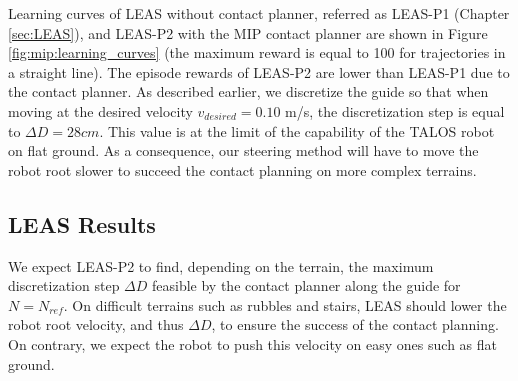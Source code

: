Learning curves of LEAS without contact planner, referred as LEAS-P1 (Chapter \ref{sec:LEAS}), and LEAS-P2 with the MIP contact planner are shown in Figure \ref{fig:mip:learning_curves} (the maximum reward is equal to 100 for trajectories in a straight line).
The episode rewards of LEAS-P2 are lower than LEAS-P1 due to the contact planner. 
As described earlier, we discretize the guide so that when moving at the desired velocity $v_{desired}=0.10$ m/s, the discretization step is equal to $\Delta D=28cm$. 
This value is at the limit of the capability of the TALOS robot on flat ground. 
As a consequence, our steering method will have to move the robot root slower to succeed the contact planning on more complex terrains.


\subsection{LEAS Results\label{subsub:mip:results}}





We expect LEAS-P2 to find, depending on the terrain, the maximum discretization step $\Delta D$ feasible by the contact planner along the guide for $N=N_{ref}$.
On difficult terrains such as rubbles and stairs, LEAS should lower the robot root velocity, and thus $\Delta D$, to ensure the success of the contact planning. 
On contrary, we expect the robot to push this velocity on easy ones such as flat ground.


